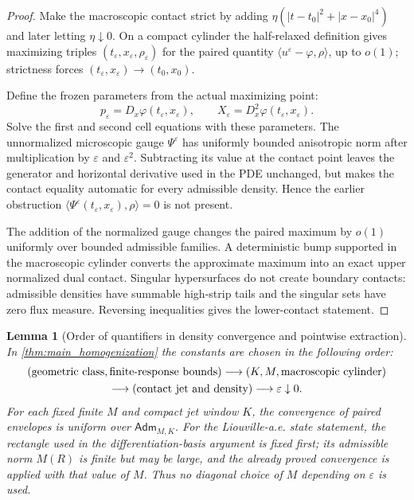 \documentclass[12pt, letterpaper]{amsart}
\newcommand{\Adm}{\mathsf{Adm}}
\theoremstyle{plain}
\newtheorem{lemma}[theorem]{Lemma}
\theoremstyle{definition}
\theoremstyle{remark}
\begin{document}
\begin{proof}
Make the macroscopic contact strict by adding
$\eta(|t-t_0|^2+|x-x_0|^4)$ and later letting $\eta\downarrow0$.  On a compact
cylinder the half-relaxed definition gives maximizing triples
$(t_\varepsilon,x_\varepsilon,\rho_\varepsilon)$ for the paired quantity
$\langle u^\varepsilon-\varphi,\rho\rangle$, up to $o(1)$; strictness forces
$(t_\varepsilon,x_\varepsilon)\to(t_0,x_0)$.

Define the frozen parameters from the actual maximizing point:
\begin{equation}
    p_\varepsilon=D_x\varphi(t_\varepsilon,x_\varepsilon),
    \qquad
    X_\varepsilon=D_x^2\varphi(t_\varepsilon,x_\varepsilon).
\end{equation}
Solve the first and second cell equations with these parameters.  The
unnormalized microscopic gauge $\Psi^\varepsilon$ has uniformly bounded
anisotropic norm after multiplication by $\varepsilon$ and $\varepsilon^2$.
Subtracting its value at the contact point leaves the generator and horizontal
derivative used in the PDE unchanged, but makes the contact equality automatic
for every admissible density.  Hence the earlier obstruction
$\langle\Psi^\varepsilon(t_\varepsilon,x_\varepsilon),\rho\rangle=0$ is not
present.

The addition of the normalized gauge changes the paired maximum by $o(1)$
uniformly over bounded admissible families.  A deterministic bump supported in
the macroscopic cylinder converts the approximate maximum into an exact upper
normalized dual contact.  Singular hypersurfaces do not create boundary
contacts: admissible densities have summable high-strip tails and the singular
sets have zero flux measure.  Reversing inequalities gives the lower-contact
statement.
\end{proof}



\begin{lemma}[Order of quantifiers in density convergence and pointwise extraction]
\label{lem:quantifier_order_density_pointwise}
In \cref{thm:main_homogenization} the constants are chosen in the following
order:
\begin{equation}
\begin{gathered}
    (\hbox{geometric class},\hbox{finite-response bounds})
    \longrightarrow
    (K,M,\hbox{macroscopic cylinder})\\
    \longrightarrow
    (\hbox{contact jet and density})
    \longrightarrow
    \varepsilon\downarrow0 .
\end{gathered}
\end{equation}
For each fixed finite \(M\) and compact jet window \(K\), the convergence of
paired envelopes is uniform over \(\Adm_{M,K}\).  For the Liouville-a.e. state
statement, the rectangle used in the differentiation-basis argument is fixed
first; its admissible norm \(M(R)\) is finite but may be large, and the already
proved convergence is applied with that value of \(M\).  Thus no diagonal
choice of \(M\) depending on \(\varepsilon\) is used.
\end{lemma}
\end{document}

